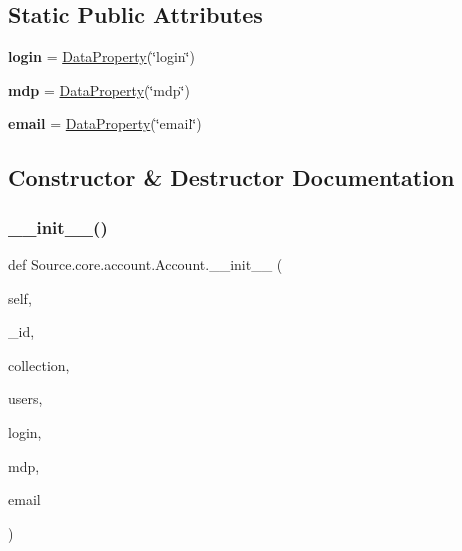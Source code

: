 \subsection*{Static Public Attributes}
\begin{DoxyCompactItemize}
\item 
\mbox{\label{classSource_1_1core_1_1account_1_1Account_a287c67e1ec615b05edc427326c0760b1}} 
{\bfseries login} = \mbox{\hyperlink{classSource_1_1core_1_1dataproperty_1_1DataProperty}{Data\+Property}}(\char`\"{}login\char`\"{})
\item 
\mbox{\label{classSource_1_1core_1_1account_1_1Account_ab94bd51e9cc1bbb247aabe7c48b35baf}} 
{\bfseries mdp} = \mbox{\hyperlink{classSource_1_1core_1_1dataproperty_1_1DataProperty}{Data\+Property}}(\char`\"{}mdp\char`\"{})
\item 
\mbox{\label{classSource_1_1core_1_1account_1_1Account_a7b4dd6c4b26008fefc2d6657f8cfc4b0}} 
{\bfseries email} = \mbox{\hyperlink{classSource_1_1core_1_1dataproperty_1_1DataProperty}{Data\+Property}}(\char`\"{}email\char`\"{})
\end{DoxyCompactItemize}


\subsection{Constructor \& Destructor Documentation}
\mbox{\label{classSource_1_1core_1_1account_1_1Account_aa71293ac376857c39d9fcbac6e0326e3}} 
\subsubsection{\texorpdfstring{\+\_\+\+\_\+init\+\_\+\+\_\+()}{\_\_init\_\_()}}
{\footnotesize\ttfamily def Source.\+core.\+account.\+Account.\+\_\+\+\_\+init\+\_\+\+\_\+ (\begin{DoxyParamCaption}\item[{}]{self,  }\item[{}]{\+\_\+id,  }\item[{}]{collection,  }\item[{}]{users,  }\item[{}]{login,  }\item[{}]{mdp,  }\item[{}]{email }\end{DoxyParamCaption})}



